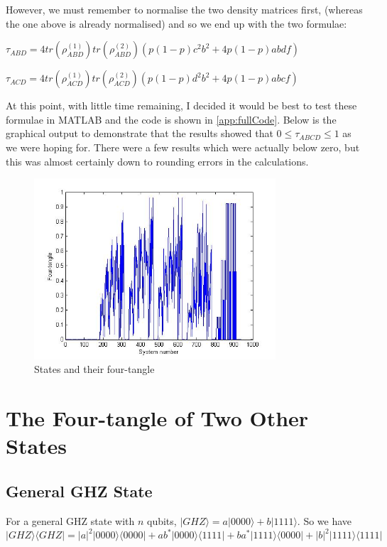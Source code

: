\documentclass[12pt,a4paper]{article}
\numberwithin{equation}{section}
\begin{document}
However, we must remember to normalise the two density matrices first, (whereas the one above is already normalised) and so we end up with the two formulae:

$\tau_{ABD} = 4tr(\rho_{ABD}^{(1)})tr(\rho_{ABD}^{(2)})(p(1-p)c^2b^2 + 4p(1-p)abdf)$

$\tau_{ACD} = 4tr(\rho_{ACD}^{(1)})tr(\rho_{ACD}^{(2)})(p(1-p)d^2b^2 + 4p(1-p)abcf)$

At this point, with little time remaining, I decided it would be best to test these formulae in MATLAB and the code is shown in \ref{app:fullCode}.
Below is the graphical output to demonstrate that the results showed that $0 \leq \tau_{ABCD} \leq 1$ as we were hoping for. There were a few results which were actually below zero, but this was almost certainly down to rounding errors in the calculations.

\begin{figure}[ht!]
\centering
\includegraphics[width=90mm]{Figure.jpg}
\caption{States and their four-tangle}
\label{fig1}
\end{figure}

\newpage

\section{The Four-tangle of Two Other States}
\label{sec:extra}

\subsection{General GHZ State}
\label{subsec:GHZ}

For a general GHZ state with $n$ qubits, $|GHZ\rangle = a|0000\rangle + b |1111\rangle$. So we have $|GHZ\rangle\langle GHZ| = |a|^2|0000\rangle\langle0000| + ab^*|0000\rangle\langle1111| + ba^*|1111\rangle\langle0000| + |b|^2|1111\rangle\langle1111|$
\end{document}

